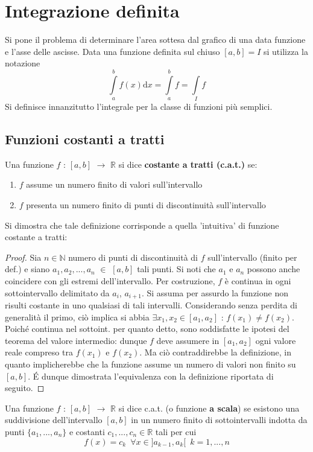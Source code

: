 \documentclass[10pt, oneside]{book}
\theoremstyle{plain}
\begin{document}
\chapter{Integrazione definita}
Si pone il problema di determinare l'area sottesa dal grafico di una data funzione e l'asse delle ascisse. Data una funzione definita sul chiuso $[a,b] = I$ si utilizza la notazione
\[\int \limits_a^b f(x) \textrm{d}x = \int \limits_a^b f = \int \limits_I f\]
Si definisce innanzitutto l'integrale per la classe di funzioni più semplici.

\section{Funzioni costanti a tratti}
\begin{defin}
    Una funzione $f$ : $[a,b]$ $\rightarrow$ $\mathbb{R}$ si dice \textbf{costante a tratti (c.a.t.)} se:
    \begin{enumerate}
        \item $f$ assume un numero finito di valori sull'intervallo
        \item $f$ presenta un numero finito di punti di discontinuità sull'intervallo
    \end{enumerate}
\end{defin}
Si dimostra che tale definizione corrisponde a quella 'intuitiva' di funzione costante a tratti:
\begin{proof}
    Sia $n \in \mathbb{N}$ numero di punti di discontinuità di $f$ sull'intervallo (finito per def.) e siano $a_1, a_2, ..., a_n$ $\in$ $[a,b]$ tali punti. Si noti che $a_1$ e $a_n$ possono anche coincidere con gli estremi dell'intervallo. Per costruzione, $f$ è continua in ogni sottointervallo delimitato da $a_i$, $a_{i+1}$. Si assuma per assurdo la funzione non risulti costante in uno qualsiasi di tali intervalli. Considerando senza perdita di generalità il primo, ciò implica si abbia $\exists x_1, x_2 \in [a_1, a_2]$ : $f(x_1) \neq f(x_2)$. Poiché continua nel sottoint. per quanto detto, sono soddisfatte le ipotesi del teorema del valore intermedio: dunque $f$ deve assumere in $[a_1, a_2]$ ogni valore reale compreso tra $f(x_1)$ e $f(x_2)$. Ma ciò contraddirebbe la definizione, in quanto implicherebbe che la funzione assume un numero di valori non finito su $[a,b]$. \'E dunque dimostrata l'equivalenza con la definizione riportata di seguito.
\end{proof}
\begin{defin}
    Una funzione $f$ : $[a,b]$ $\rightarrow$ $\mathbb{R}$ si dice c.a.t. (o funzione \textbf{a scala}) se esistono una suddivisione dell'intervallo $[a,b]$ in un numero finito di sottointervalli indotta da punti $\{a_1, ..., a_n\}$ e costanti $c_1, ..., c_n \in \mathbb{R}$ tali per cui
    \[f(x) = c_k \enspace \forall x \in ]a_{k-1}, a_k[ \enspace k=1, ..., n\]
\end{defin}
\end{document}
